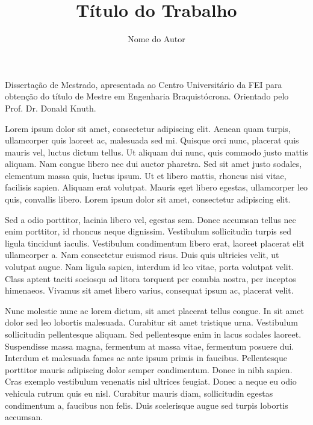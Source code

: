 \documentclass[rascunho,xindy]{fei}
\author{Nome do Autor}
\title{Título do Trabalho}
\begin{document}
\maketitle
\begin{folhaderosto}
Dissertação de Mestrado, apresentada ao Centro Universitário da FEI para obtenção do título de Mestre em Engenharia Braquistócrona. Orientado pelo Prof. Dr. Donald Knuth.
\end{folhaderosto}
\fichacatalografica
\folhadeaprovacao
{}
\begin{agradecimentos}
Lorem ipsum dolor sit amet, consectetur adipiscing elit. Aenean quam turpis, ullamcorper quis laoreet ac, malesuada sed mi. Quisque orci nunc, placerat quis mauris vel, luctus dictum tellus. Ut aliquam dui nunc, quis commodo justo mattis aliquam. Nam congue libero nec dui auctor pharetra. Sed sit amet justo sodales, elementum massa quis, luctus ipsum. Ut et libero mattis, rhoncus nisi vitae, facilisis sapien. Aliquam erat volutpat. Mauris eget libero egestas, ullamcorper leo quis, convallis libero. Lorem ipsum dolor sit amet, consectetur adipiscing elit.

Sed a odio porttitor, lacinia libero vel, egestas sem. Donec accumsan tellus nec enim porttitor, id rhoncus neque dignissim. Vestibulum sollicitudin turpis sed ligula tincidunt iaculis. Vestibulum condimentum libero erat, laoreet placerat elit ullamcorper a. Nam consectetur euismod risus. Duis quis ultricies velit, ut volutpat augue. Nam ligula sapien, interdum id leo vitae, porta volutpat velit. Class aptent taciti sociosqu ad litora torquent per conubia nostra, per inceptos himenaeos. Vivamus sit amet libero varius, consequat ipsum ac, placerat velit.

Nunc molestie nunc ac lorem dictum, sit amet placerat tellus congue. In sit amet dolor sed leo lobortis malesuada. Curabitur sit amet tristique urna. Vestibulum sollicitudin pellentesque aliquam. Sed pellentesque enim in lacus sodales laoreet. Suspendisse massa magna, fermentum at massa vitae, fermentum posuere dui. Interdum et malesuada fames ac ante ipsum primis in faucibus. Pellentesque porttitor mauris adipiscing dolor semper condimentum. Donec in nibh sapien. Cras exemplo vestibulum venenatis nisl ultrices feugiat. Donec a neque eu odio vehicula rutrum quis eu nisl. Curabitur mauris diam, sollicitudin egestas condimentum a, faucibus non felis. Duis scelerisque augue sed turpis lobortis accumsan.


\end{agradecimentos}
\end{document}
